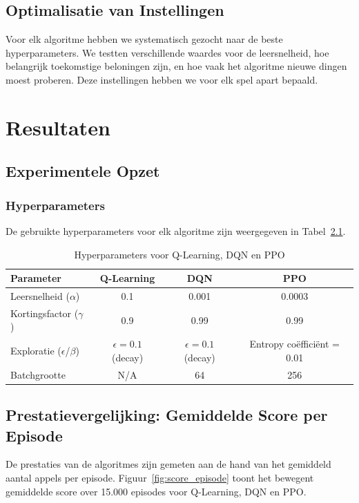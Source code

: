 \documentclass[a4paper,11pt]{report}
\begin{document}
\section{Optimalisatie van Instellingen}
Voor elk algoritme hebben we systematisch gezocht naar de beste
hyperparameters. We testten verschillende waardes voor de leersnelheid, hoe
belangrijk toekomstige beloningen zijn, en hoe vaak het algoritme nieuwe dingen
moest proberen. Deze instellingen hebben we voor elk spel apart bepaald.

\chapter{Resultaten}

\section{Experimentele Opzet}

\subsection{Hyperparameters}
De gebruikte hyperparameters voor elk algoritme zijn weergegeven in
Tabel~\ref{tab:hyperparameters}.

\begin{table}[ht]
    \centering
    \caption{Hyperparameters voor Q-Learning, DQN en PPO}
    \label{tab:hyperparameters}
    \begin{tabular}{|l|c|c|c|}
        \hline
        \textbf{Parameter}              & \textbf{Q-Learning}      & \textbf{DQN}             & \textbf{PPO}               \\ \hline
        Leersnelheid ($\alpha$)         & 0.1                      & 0.001                    & 0.0003                     \\ \hline
        Kortingsfactor ($\gamma$)       & 0.9                      & 0.99                     & 0.99                       \\ \hline
        Exploratie ($\epsilon$/$\beta$) & $\epsilon = 0.1$ (decay) & $\epsilon = 0.1$ (decay) & Entropy coëfficiënt = 0.01 \\ \hline
        Batchgrootte                    & N/A                      & 64                       & 256                        \\ \hline
    \end{tabular}
\end{table}

\section{Prestatievergelijking: Gemiddelde Score per Episode}
De prestaties van de algoritmes zijn gemeten aan de hand van het gemiddeld
aantal appels per episode. Figuur~\ref{fig:score_episode} toont het bewegent
gemiddelde score over 15.000 episodes voor Q-Learning, DQN en PPO.
\end{document}

